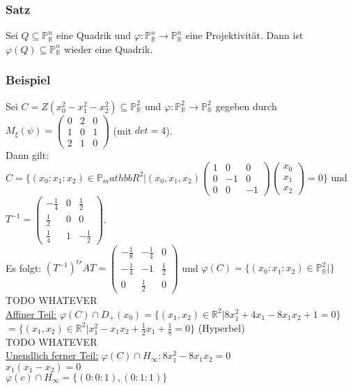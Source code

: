 \documentclass[a4paper]{article}
\newcommand{\ul}{\underline}
\let\phi\varphi
\begin{document}
\subsubsection{Satz}
Sei \(Q\subseteq \mathbb{P}_\mathbb{R}^n\) eine Quadrik und \(\phi:\mathbb{P}_\mathbb{R}^n\rightarrow\mathbb{P}_\mathbb{R}^n\) eine Projektivität. Dann ist \(\phi(Q)\subseteq\mathbb{P}_\mathbb{R}^n\) wieder eine Quadrik.
\subsubsection{Beispiel}
Sei \(C=Z(x_0^2-x_1^2-x_2^2)\subseteq\mathbb{P}_\mathbb{R}^2\) und \(\phi:\mathbb{P}_\mathbb{R}^2\rightarrow\mathbb{P}_\mathbb{R}^2\) gegeben durch \(M_\xi(\psi)=\begin{pmatrix}
0 & 2 & 0\\
1 & 0 & 1\\
2 & 1 & 0
\end{pmatrix}\) (mit \(det = 4\)).\\
Dann gilt: \(C=\{(x_0:x_1:x_2)\in\mathbb{P}_mathbb{R}^2|(x_0,x_1,x_2)\begin{pmatrix}
1 & 0 & 0\\
0 & -1 & 0\\
0 & 0 & -1
\end{pmatrix}\begin{pmatrix}
x_0\\
x_1\\
x_2
\end{pmatrix}=0\}\) und \(T^{-1}=\begin{pmatrix}
-\frac{1}{4} & 0 & \frac{1}{2}\\
\frac{1}{2} & 0 & 0\\
\frac{1}{4} & 1 & -\frac{1}{2}
\end{pmatrix}\).\\
Es folgt: \((T^{-1})^{tr}AT=\begin{pmatrix}
-\frac{1}{8} & -\frac{1}{4} & 0\\
-\frac{1}{4} & -1 & \frac{1}{2}\\
0 & \frac{1}{2} & 0
\end{pmatrix}\) und \(\phi(C)=\{(x_0:x_1:x_2)\in\mathbb{P}_\mathbb{R}^2|\}\)TODO WHATEVER\\
\ul{Affiner Teil:} \(\phi(C)\cap D_+(x_0)=\{(x_1,x_2)\in\mathbb{R}^2|8x_1^2+4x_1-8x_1x_2+1=0\}\)\\
\(=\{(x_1,x_2)\in\mathbb{R}^2|x_1^2-x_1x_2+\frac{1}{2}x_1+\frac{1}{8}=0\}\) (Hyperbel)\\
TODO WHATEVER\\
\ul{Unendlich ferner Teil:} \(\phi(C)\cap H_\infty: 8x_1^2-8x_1x_2=0\)\\
\(x_1(x_1-x_2)=0\)\\
\(\phi(c)\cap H_\infty=\{(0:0:1),(0:1:1)\}\)
\end{document}
